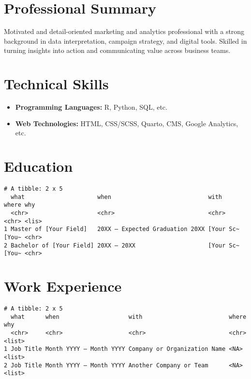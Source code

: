 \documentclass[
]{article}
\author{}
\date{\vspace{-2.5em}May 2025}
\providecommand{\tightlist}{%
  \setlength{\itemsep}{0pt}\setlength{\parskip}{0pt}}
\begin{document}
\section{Professional Summary}\label{professional-summary}

Motivated and detail-oriented marketing and analytics professional with
a strong background in data interpretation, campaign strategy, and
digital tools. Skilled in turning insights into action and communicating
value across business teams.

\section{Technical Skills}\label{technical-skills}

\begin{itemize}
\tightlist
\item
  \textbf{Programming Languages:} R, Python, SQL, etc.\\
\item
  \textbf{Web Technologies:} HTML, CSS/SCSS, Quarto, CMS, Google
  Analytics, etc.
\end{itemize}

\section{Education}\label{education}

\begin{verbatim}
# A tibble: 2 x 5
  what                     when                            with      where why  
  <chr>                    <chr>                           <chr>     <chr> <lis>
1 Master of [Your Field]   20XX – Expected Graduation 20XX [Your Sc~ [You~ <chr>
2 Bachelor of [Your Field] 20XX – 20XX                     [Your Sc~ [You~ <chr>
\end{verbatim}

\section{Work Experience}\label{work-experience}

\begin{verbatim}
# A tibble: 2 x 5
  what      when                    with                         where why   
  <chr>     <chr>                   <chr>                        <chr> <list>
1 Job Title Month YYYY – Month YYYY Company or Organization Name <NA>  <list>
2 Job Title Month YYYY – Month YYYY Another Company or Team      <NA>  <list>
\end{verbatim}
\end{document}
